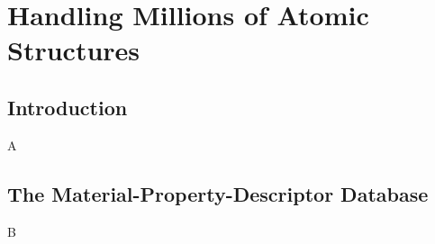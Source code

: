 \chapter{Handling Millions of Atomic Structures} \label{chap:mpdd}

\section{Introduction} \label{sec:background}

A


\section{The Material-Property-Descriptor Database} \label{sec:mpdd}


B


\printbibliography[heading=subbibintoc]